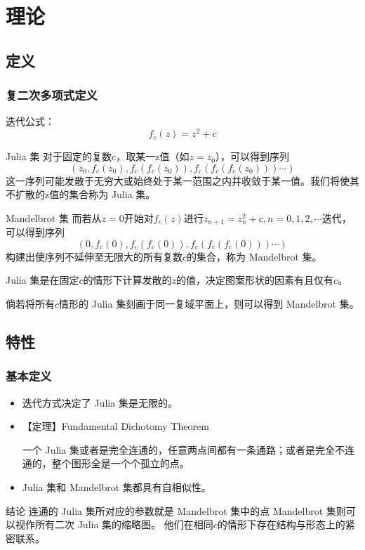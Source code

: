 \documentclass[8pt,c,compress,UTF8]{ctexbeamer}
\begin{document}
\section{理论}

\subsection{定义}
\begin{frame} 
\frametitle{复二次多项式定义}
迭代公式：
$$f_c(z)=z^2+c$$
\begin{block}{Julia 集}
对于固定的复数c，取某一z值（如$z=z_0$），可以得到序列
$$(z_0,f_c(z_0),f_c(f_c(z_0)),f_c(f_c(f_c(z_0)))\cdots)$$
这一序列可能发散于无穷大或始终处于某一范围之内并收敛于某一值。我们将\alert{使其不扩散的z值的集合}称为 Julia 集。
\end{block}
\begin{block}{Mandelbrot 集}
而若从$z=0$开始对$f_c(z)$进行$z_{n+1}=z^2_n+c,n=0,1,2,\cdots$迭代，
可以得到序列
$$(0,f_c(0),f_c(f_c(0)),f_c(f_c(f_c(0)))\cdots)$$
构建出\alert{使序列不延伸至无限大的所有复数$c$的集合}，称为 Mandelbrot 集。
\end{block}
Julia 集是在固定$c$的情形下计算发散的$z$的值，决定图案形状的因素有且仅有$c$。

倘若将所有$c$情形的 Julia 集刻画于同一复域平面上，则可以得到 Mandelbrot 集。
\end{frame}

\subsection{特性}
\begin{frame} 
\frametitle{基本定义}
\begin{itemize}
    \item 迭代方式决定了 Julia 集是无限的。
    \item \alert{【定理】Fundamental Dichotomy Theorem}

    一个 Julia 集或者是完全连通的，任意两点间都有一条通路；或者是完全不连通的，整个图形全是一个个孤立的点。
    \item Julia 集和 Mandelbrot 集都具有自相似性。
\end{itemize}
\begin{block}{结论}
连通的 Julia 集所对应的参数就是 Mandelbrot 集中的点
Mandelbrot 集则可以视作所有二次 Julia 集的缩略图。
他们在相同$c$的情形下存在结构与形态上的紧密联系。
\end{block}
\end{frame}
\end{document}

